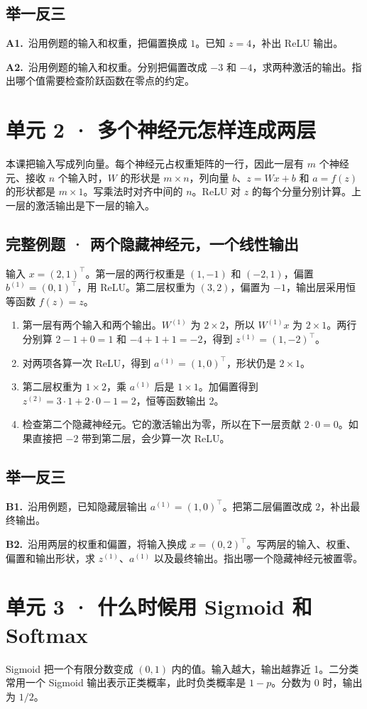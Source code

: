 \documentclass[UTF8,a4paper,11pt]{ctexart}
\newcommand{\CompactQuestion}[2]{\par\noindent\textbf{#1.}\ #2\par\vspace{.8em}}
\begin{document}
\subsection{举一反三}
\CompactQuestion{A1}{沿用例题的输入和权重，把偏置换成 $1$。已知 $z=4$，补出 ReLU 输出。}
\CompactQuestion{A2}{沿用例题的输入和权重。分别把偏置改成 $-3$ 和 $-4$，求两种激活的输出。指出哪个值需要检查阶跃函数在零点的约定。}
\clearpage
\section{单元 2 · 多个神经元怎样连成两层}
本课把输入写成列向量。每个神经元占权重矩阵的一行，因此一层有 $m$ 个神经元、接收 $n$ 个输入时，$W$ 的形状是 $m\times n$，列向量 $b$、$z=Wx+b$ 和 $a=f(z)$ 的形状都是 $m\times1$。写乘法时对齐中间的 $n$。ReLU 对 $z$ 的每个分量分别计算。上一层的激活输出是下一层的输入。

\subsection{完整例题 · 两个隐藏神经元，一个线性输出}
输入 $x=(2,1)^\top$。第一层的两行权重是 $(1,-1)$ 和 $(-2,1)$，偏置 $b^{(1)}=(0,1)^\top$，用 ReLU。第二层权重为 $(3,2)$，偏置为 $-1$，输出层采用恒等函数 $f(z)=z$。

\begin{enumerate}
\item 第一层有两个输入和两个输出。$W^{(1)}$ 为 $2\times2$，所以 $W^{(1)}x$ 为 $2\times1$。两行分别算 $2-1+0=1$ 和 $-4+1+1=-2$，得到 $z^{(1)}=(1,-2)^\top$。
\item 对两项各算一次 ReLU，得到 $a^{(1)}=(1,0)^\top$，形状仍是 $2\times1$。
\item 第二层权重为 $1\times2$，乘 $a^{(1)}$ 后是 $1\times1$。加偏置得到 $z^{(2)}=3\cdot1+2\cdot0-1=2$，恒等函数输出 2。
\item 检查第二个隐藏神经元。它的激活输出为零，所以在下一层贡献 $2\cdot0=0$。如果直接把 $-2$ 带到第二层，会少算一次 ReLU。
\end{enumerate}
\subsection{举一反三}
\CompactQuestion{B1}{沿用例题，已知隐藏层输出 $a^{(1)}=(1,0)^\top$。把第二层偏置改成 $2$，补出最终输出。}
\CompactQuestion{B2}{沿用两层的权重和偏置，将输入换成 $x=(0,2)^\top$。写两层的输入、权重、偏置和输出形状，求 $z^{(1)}$、$a^{(1)}$ 以及最终输出。指出哪一个隐藏神经元被置零。}
\clearpage
\section{单元 3 · 什么时候用 Sigmoid 和 Softmax}
Sigmoid 把一个有限分数变成 $(0,1)$ 内的值。输入越大，输出越靠近 1。二分类常用一个 Sigmoid 输出表示正类概率，此时负类概率是 $1-p$。分数为 0 时，输出为 $1/2$。
\end{document}

